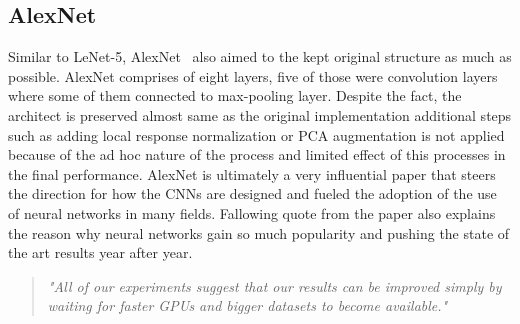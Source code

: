 \subsection{AlexNet}
Similar to LeNet-5, AlexNet~\cite{Alexnet} also aimed to the kept original structure as much as possible.
AlexNet comprises of eight layers, five of those were convolution layers where some of them connected to max-pooling layer. 
Despite the fact, the architect is preserved almost same as the original implementation additional steps such as adding local response normalization or PCA augmentation is not applied because of the ad hoc nature of the process and limited effect of this processes in the final performance.
AlexNet is ultimately a very influential paper that steers the direction for how the CNNs are designed and fueled the adoption of the use of neural networks in many fields.
Fallowing quote from the paper also explains the reason why neural networks gain so much popularity and pushing the state of the art results year after year.
\begin{quote}
    \textit{"All of our experiments suggest that our results
can be improved simply by waiting for faster GPUs and bigger datasets to become available."}
\end{quote}

